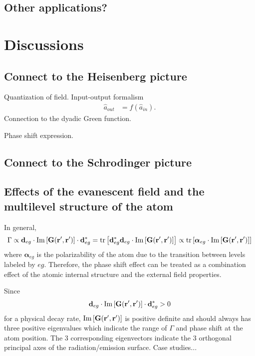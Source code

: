 \documentclass[preprint,pra,onecolumn]{revtex4-1} %
\begin{document}
\subsection{Other applications?} 


\section{Discussions}

\subsection{Connect to the Heisenberg picture}
Quantization of field. Input-output formalism
\begin{align}
\hat{a}_{out} &= f(\hat{a}_{in}).
\end{align}
Connection to the dyadic Green function.

Phase shift expression. 

\subsection{Connect to the Schrodinger picture}

\subsection{Effects of the evanescent field and the multilevel structure of the atom}
In general, 
\begin{align}
\Gamma \propto \mathbf{d}_{eg}\cdot \mathrm{Im}\left[\mathbf{G}(\mathbf{r}',\mathbf{r}') \right]\cdot\mathbf{d}_{eg}^*=\mathrm{tr}\left[\mathbf{d}_{eg}^*\mathbf{d}_{eg}\cdot \mathrm{Im}\left[\mathbf{G}(\mathbf{r}',\mathbf{r}') \right] \right]\propto \mathrm{tr}\left[\boldsymbol{\alpha}_{eg}\cdot \mathrm{Im}\left[\mathbf{G}(\mathbf{r}',\mathbf{r}') \right] \right]
\end{align}
where $ \boldsymbol{\alpha}_{eg} $ is the polarizability of the atom due to the transition between levels labeled by $ eg $. Therefore, the phase shift effect can be treated as a combination effect of the atomic internal structure and the external field properties. 

Since 
\begin{align}
\mathbf{d}_{eg}\cdot \mathrm{Im}\left[\mathbf{G}(\mathbf{r}',\mathbf{r}') \right]\cdot\mathbf{d}_{eg}^*>0
\end{align}
for a physical decay rate, $\mathrm{Im}\left[\mathbf{G}(\mathbf{r}',\mathbf{r}')\right]$ is positive definite and should always has three positive eigenvalues which indicate the range of $ \Gamma $ and phase shift at the atom position. The 3 corresponding eigenvectors indicate the 3 orthogonal principal axes of the radiation/emission surface. Case studies...
\end{document}
